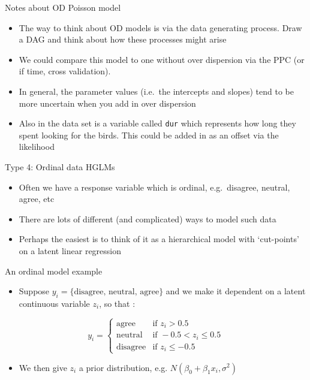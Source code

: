 \documentclass[ignorenonframetext,]{beamer}
\providecommand{\tightlist}{%
  \setlength{\itemsep}{0pt}\setlength{\parskip}{0pt}}
\begin{document}
\begin{frame}[fragile]{Notes about OD Poisson model}

\begin{itemize}
\item
  The way to think about OD models is via the data generating process.
  Draw a DAG and think about how these processes might arise
\item
  We could compare this model to one without over dispersion via the PPC
  (or if time, cross validation).
\item
  In general, the parameter values (i.e.~the intercepts and slopes) tend
  to be more uncertain when you add in over dispersion
\item
  Also in the data set is a variable called \texttt{dur} which
  represents how long they spent looking for the birds. This could be
  added in as an offset via the likelihood
\end{itemize}

\end{frame}

\begin{frame}{Type 4: Ordinal data HGLMs}

\begin{itemize}
\tightlist
\item
  Often we have a response variable which is ordinal, e.g.~disagree,
  neutral, agree, etc
\item
  There are lots of different (and complicated) ways to model such data
\item
  Perhaps the easiest is to think of it as a hierarchical model with
  `cut-points' on a latent linear regression
\end{itemize}

\end{frame}

\begin{frame}{An ordinal model example}

\begin{itemize}
\tightlist
\item
  Suppose \(y_i = \{\mbox{disagree, neutral, agree} \}\) and we make it
  dependent on a latent continuous variable \(z_i\), so that :
\end{itemize}

\[y_i = \left\{ \begin{array}{ll} \mbox{agree} & \mbox{if } z_i> 0.5 \\
\mbox{neutral} & \mbox{if } -0.5 < z_i \le 0.5 \\
\mbox{disagree} & \mbox{if } z_i \le -0.5 \end{array} \right.\]

\begin{itemize}
\tightlist
\item
  We then give \(z_i\) a prior distribution, e.g.
  \(N(\beta_0 + \beta_1 x_i, \sigma^2)\)
\end{itemize}

\end{frame}
\end{document}
